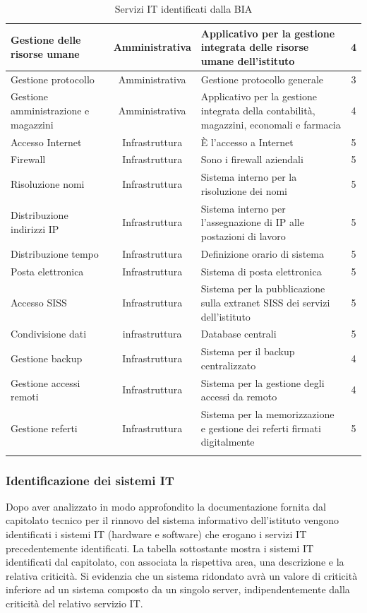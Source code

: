 \documentclass[12pt, a4paper, titlepage]{report}
\begin{document}
\begin{longtable}{| p{4cm} | c | p{6cm} | c |}
				Gestione delle risorse umane & Amministrativa & Applicativo per la gestione integrata delle risorse umane dell'istituto & 4 \\ \hline
				Gestione protocollo & Amministrativa & Gestione protocollo generale & 3 \\ \hline
				Gestione amministrazione e magazzini & Amministrativa & Applicativo per la gestione integrata della contabilità, magazzini, economali e farmacia & 4 \\ \hline
				Accesso Internet & Infrastruttura & È l'accesso a Internet & 5 \\ \hline
				Firewall & Infrastruttura & Sono i firewall aziendali & 5 \\ \hline
				Risoluzione nomi & Infrastruttura & Sistema interno per la risoluzione dei nomi & 5 \\ \hline
				Distribuzione indirizzi IP & Infrastruttura & Sistema interno per l'assegnazione di IP alle postazioni di lavoro & 5 \\ \hline
				Distribuzione tempo & Infrastruttura & Definizione orario di sistema & 5 \\ \hline
				Posta elettronica & Infrastruttura & Sistema di posta elettronica & 5 \\ \hline
				Accesso SISS & Infrastruttura & Sistema per la pubblicazione sulla extranet SISS dei servizi dell'istituto & 5 \\ \hline
				Condivisione dati & infrastruttura & Database centrali & 5 \\ \hline
				Gestione backup & Infrastruttura & Sistema per il backup centralizzato & 4 \\ \hline
				Gestione accessi remoti & Infrastruttura & Sistema per la gestione degli accessi da remoto & 4 \\ \hline
				Gestione referti & Infrastruttura & Sistema per la memorizzazione e gestione dei referti firmati digitalmente & 5 \\ \hline
				\caption{Servizi IT identificati dalla BIA}
			\end{longtable}
			\newpage
		\subsubsection{Identificazione dei sistemi IT}
		
		Dopo aver analizzato in modo approfondito la documentazione fornita dal capitolato tecnico per il rinnovo del sistema informativo dell'istituto vengono identificati i sistemi IT (hardware e software) che erogano i servizi IT precedentemente identificati. La tabella sottostante mostra i sistemi IT identificati dal capitolato, con associata la rispettiva area, una descrizione e la relativa criticità. Si evidenzia che un sistema ridondato avrà un valore di criticità inferiore ad un sistema composto da un singolo server, indipendentemente dalla criticità del relativo servizio IT.
		
\end{document}
